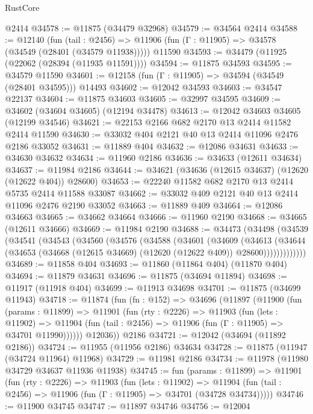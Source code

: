 \begin{lexlean}{RustCore}
\begin{coremodule}
    @2414
@34578 := @11875 (@34479 @32968)
@34579 := @34564 @2414
@34588 := @12140
    (fun (tail : @2456) => @11906 (fun (Γ : @11905) => @34578 (@34549 (@28401 (@34579 @11938)))))
    @11590
@34593 := @34479 (@11925 (@22062 (@28394 (@11935 @11591))))
@34594 := @11875 @34593
@34595 := @34579 @11590
@34601 := @12158 (fun (Γ : @11905) => @34594 (@34549 (@28401 @34595))) @14493
@34602 := @12042 @34593
@34603 := @34547 @22137
@34604 := @11875 @34603
@34605 := @32997 @34595
@34609 := @34602 (@34604 @34605) (@12194 @34478)
@34613 := @12042 @34603 @34605 (@12199 @34546)
@34621 := @22153 @2166 @682 @2170 @13 @2414 @11582 @2414 @11590
@34630 := @33032 @404 @2121 @40 @13 @2414 @11096 @2476 @2186 @33052
@34631 := @11889 @404
@34632 := @12086 @34631
@34633 := @34630 @34632
@34634 := @11960 @2186
@34636 := @34633 (@12611 @34634)
@34637 := @11984 @2186
@34644 := @34621 (@34636 (@12615 @34637) (@12620 (@12622 @404)) @28600)
@34653 := @22240 @11582 @682 @2170 @13 @2414 @5735 @2414 @11588 @33087
@34662 := @33032 @409 @2121 @40 @13 @2414 @11096 @2476 @2190 @33052
@34663 := @11889 @409
@34664 := @12086 @34663
@34665 := @34662 @34664
@34666 := @11960 @2190
@34668 := @34665 (@12611 @34666)
@34669 := @11984 @2190
@34688 := @34473
    (@34498
      (@34539
        (@34541
          (@34543
            (@34560
              (@34576
                (@34588
                  (@34601
                    (@34609
                      (@34613
                        (@34644
                          (@34653 (@34668 (@12615 @34669) (@12620 (@12622 @409)) @28600)))))))))))))
@34689 := @11858 @404
@34693 := @11860 (@11864 @404) (@11870 @404)
@34694 := @11879 @34631
@34696 := @11875 (@34694 @11894)
@34698 := @11917 (@11918 @404)
@34699 := @11913 @34698
@34701 := @11875 (@34699 @11943)
@34718 := @11874
    (fun (fn : @152) =>
    @34696
      (@11897
        (@11900
          (fun (params : @11899) =>
          @11901
            (fun (rty : @2226) =>
            @11903
              (fun (lets : @11902) =>
              @11904 (fun (tail : @2456) => @11906 (fun (Γ : @11905) => @34701 @11990))))))
        @12036))
    @2186
@34721 := @12042 (@34694 (@11892 @2186))
@34724 := @11955 (@11956 @2186) @34634
@34728 := @11875 (@11947 (@34724 @11964) @11968)
@34729 := @11981 @2186
@34734 := @11978 (@11980 @34729 @34637 @11936 @11938)
@34745 := fun (params : @11899) =>
  @11901
    (fun (rty : @2226) =>
    @11903
      (fun (lets : @11902) =>
      @11904 (fun (tail : @2456) => @11906 (fun (Γ : @11905) => @34701 (@34728 @34734)))))
@34746 := @11900 @34745
@34747 := @11897 @34746
@34756 := @12004

\end{coremodule}
\end{lexlean}
